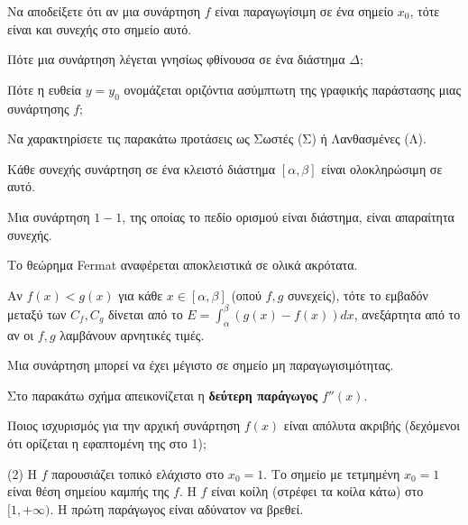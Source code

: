 \documentclass[11pt,a4paper]{article}
\newcommand{\kerkissans}[1]{{\fontfamily{maksf}\selectfont \textbf{#1}}}
\renewcommand{\textdexiakeraia}{}
\newcommand{\dint}{\displaystyle\int}
\newcommand\themanum{A}
\newcounter{thema}[section]
\renewcommand{\thethema}{\arabic{thema}}
\newcommand{\Thema}{\refstepcounter{thema}{\textbf{\textcolor{black}{\faPenSquare\ \  \large \kerkissans{\textbf{\thethemaο\hspace{2mm}Διαγώνισμα - Θέμα \themanum}}}}}\hspace{0mm}}{}
\newenvironment{thema}[1]
{\begin{tcolorbox}[title=\Thema\kerkissans{\textbf{\large{  #1}}},breakable,
enhanced standard,titlerule=0pt,toprule=0pt, rightrule=0pt, bottomrule=0pt,
colback=white,left=0mm,top=1mm,bottom=0mm,
boxrule=0pt,
colframe=white,leftrule=0mm,sharp corners,coltitle=black]
\renewcommand{\themanum}{#1}}
{\end{tcolorbox}}
\newcommand{\eng}[1]{\selectlanguage{english}#1\selectlanguage{greek}}
\begin{document}
\begin{thema}{A}
\begin{erwthma}
    \item Να αποδείξετε ότι αν μια συνάρτηση $f$ είναι παραγωγίσιμη σε ένα σημείο $x_0$, τότε είναι και συνεχής στο σημείο αυτό.
    \item Πότε μια συνάρτηση λέγεται γνησίως φθίνουσα σε ένα διάστημα $\Delta$;
    \item Πότε η ευθεία $y=y_0$ ονομάζεται οριζόντια ασύμπτωτη της γραφικής παράστασης μιας συνάρτησης $f$;
    \item Να χαρακτηρίσετε τις παρακάτω προτάσεις ως Σωστές (Σ) ή Λανθασμένες (Λ).
    \begin{alist}
        \item Κάθε συνεχής συνάρτηση σε ένα κλειστό διάστημα $[\alpha, \beta]$ είναι ολοκληρώσιμη σε αυτό.
        \item Μια συνάρτηση $1-1$, της οποίας το πεδίο ορισμού είναι διάστημα, είναι απαραίτητα συνεχής.
        \item Το θεώρημα {\eng{Fermat}} αναφέρεται αποκλειστικά σε ολικά ακρότατα.
        \item Αν $f(x)<g(x)$ για κάθε $x \in [\alpha, \beta]$ (οπού $f,g$ συνεχείς), τότε το εμβαδόν μεταξύ των $C_f, C_g$ δίνεται από το $E = \dint_\alpha^\beta (g(x)-f(x))dx$, ανεξάρτητα από το αν οι $f, g$ λαμβάνουν αρνητικές τιμές.
        \item Μια συνάρτηση μπορεί να έχει μέγιστο σε σημείο μη παραγωγισιμότητας.
    \end{alist}
    \item Στο παρακάτω σχήμα απεικονίζεται η \textbf{δεύτερη παράγωγος} $f''(x)$. 
    \begin{center}
    \end{center}
    Ποιος ισχυρισμός για την αρχική συνάρτηση $f(x)$ είναι απόλυτα ακριβής (δεχόμενοι ότι ορίζεται η εφαπτομένη της στο 1);
    \begin{tasks}[label=\let\textdexiakeraia\relax\alph*.](2)
        \task Η $f$ παρουσιάζει τοπικό ελάχιστο στο $x_0 = 1$.
        \task Το σημείο με τετμημένη $x_0 = 1$ είναι θέση σημείου καμπής της $f$.
        \task Η $f$ είναι κοίλη (στρέφει τα κοίλα κάτω) στο $[1, +\infty)$.
        \task Η πρώτη παράγωγος είναι αδύνατον να βρεθεί.
    \end{tasks}
\end{erwthma}
\end{thema}
\vspace{1cm}
\end{document}

